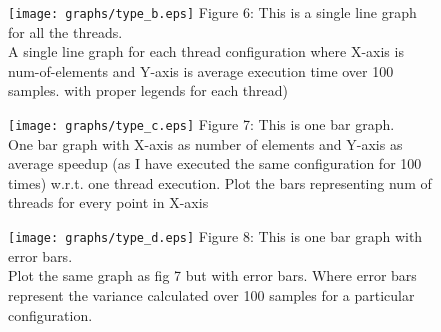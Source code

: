 \documentclass{article}
\begin{document}
\begin{figure}
\centering
\texttt{[image: graphs/type\_b.eps]}\newline
\vspace{60 pt}
 Figure 6: This is a single line graph for all the threads. \\
 \vspace{0.4 cm}
 A single line graph for each thread configuration where X-axis is num-of-elements and Y-axis is average execution time over 100 samples.
with proper legends for each thread)
\end{figure}
\begin{figure}
\centering
\texttt{[image: graphs/type\_c.eps]}\newline
\vspace{60 pt}
 Figure 7: This is one bar graph.\\
 \vspace{0.4 cm}
 One bar graph with X-axis as number of elements and Y-axis as average speedup (as I have
executed the same configuration for 100 times) w.r.t. one thread execution. Plot the bars representing num of threads for every point in X-axis
\end{figure}
\begin{figure}
\centering
\texttt{[image: graphs/type\_d.eps]}\newline
\vspace{60 pt}
 Figure 8: This is one bar graph with error bars.\\
 \vspace{0.4 cm}
 Plot the same graph as fig 7 but with error bars. Where error bars represent the variance calculated over 100 samples for a particular configuration.
\end{figure}
\end{document}
